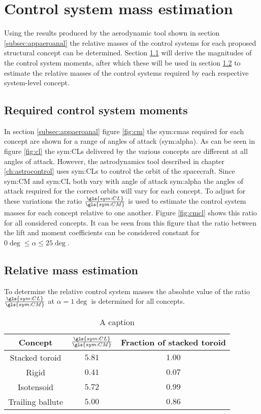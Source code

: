 \section{Control system mass estimation}
\label{sec:controlmass}
Using the results produced by the aerodynamic tool shown in section \ref{subsec:appaeroanal} the relative masses of the control systems for each proposed structural concept can be determined. Section \ref{subsec:controlmoments} will derive the magnitudes of the control system moments, after which these will be used in section \ref{subsec:controlmassest} to estimate the relative masses of the control systems required by each respective system-level concept.

\subsection{Required control system moments}
\label{subsec:controlmoments}
In section \ref{subsec:appaeroanal} figure \ref{fig:cm} the \glspl{sym:cma} required for each concept are shown for a range of angles of attack (\gls{sym:alpha}). As can be seen in figure \ref{fig:cl} the \glspl{sym:CL} delivered by the various concepts are different at all angles of attack. However, the astrodynamics tool described in chapter \ref{ch:astrocontrol} uses \glspl{sym:CL} to control the orbit of the spacecraft. Since \gls{sym:CM} and \gls{sym:CL} both vary with angle of attack \gls{sym:alpha} the angles of attack required for the correct orbits will vary for each concept. To adjust for these variations the ratio $\frac{\gls{sym:CL}}{\gls{sym:CM}}$ is used to estimate the control system masses for each concept relative to one another. Figure \ref{fig:cmcl} shows this ratio for all considered concepts. It can be seen from this figure that the ratio between the lift and moment coefficients can be considered constant for $0\deg\leq\alpha\leq 25\deg$.

\subsection{Relative mass estimation}
\label{subsec:controlmassest}
To determine the relative control system masses the absolute value of the ratio $\frac{\gls{sym:CL}}{\gls{sym:CM}}$ at $\alpha=1\deg$ is determined for all concepts.
\begin{table}[h]
	\centering
	\caption{A caption}
	\begin{tabular}{|c|c|c|}
		\hline
		\textbf{Concept} & $\frac{\gls{sym:CL}}{\gls{sym:CM}}$ & Fraction of stacked toroid \\ \hline \hline
		Stacked toroid & $5.81$ & $1.00$\\
		Rigid & $0.41$ & $0.07$\\
		Isotensoid & $5.72$ & $0.99$\\
		Trailing ballute & $5.00$ & $0.86$\\
		\hline
	\end{tabular}
	\label{tab:controlmass}
\end{table}